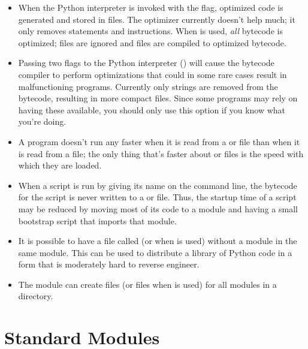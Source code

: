 \documentclass{manual}
\begin{document}
\begin{itemize}

\item
When the Python interpreter is invoked with the  flag,
optimized code is generated and stored in  files.
The optimizer currently doesn't help much; it only removes
 statements and  instructions.
When  is used, \emph{all} bytecode is optimized; 
files are ignored and  files are compiled to optimized
bytecode.

\item
Passing two  flags to the Python interpreter ()
will cause the bytecode compiler to perform optimizations that could
in some rare cases result in malfunctioning programs.  Currently only
 strings are removed from the bytecode, resulting in more 
compact  files.  Since some programs may rely on having
these available, you should only use this option if you know what
you're doing.

\item
A program doesn't run any faster when it is read from a
 or  file than when it is read from a 
file; the only thing that's faster about  or 
files is the speed with which they are loaded.

\item
When a script is run by giving its name on the command line, the
bytecode for the script is never written to a  or
 file.  Thus, the startup time of a script may be reduced
by moving most of its code to a module and having a small bootstrap
script that imports that module.

\item
It is possible to have a file called  (or
 when  is used) without a module
 in the same module.  This can be used to distribute
a library of Python code in a form that is moderately hard to reverse
engineer.

\item
The module  can create
 files (or  files when  is used) for
all modules in a directory.

\end{itemize}


\section{Standard Modules \label{standardModules}}
\end{document}
